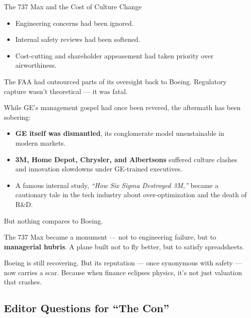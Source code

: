 \begin{HistoricalSidebar}{The 737 Max and the Cost of Culture Change}
  \medskip

  \begin{itemize}
    \item Engineering concerns had been ignored.
    \item Internal safety reviews had been softened.
    \item Cost-cutting and shareholder appeasement had taken priority over airworthiness.
  \end{itemize}

  \medskip
  
  The FAA had outsourced parts of its oversight back to Boeing.  
  Regulatory capture wasn’t theoretical — it was fatal.
  
  \medskip
  
  While GE’s management gospel had once been revered, the aftermath has been sobering:
  
  \medskip

  \begin{itemize}
    \item \textbf{GE itself was dismantled}, its conglomerate model unsustainable in modern markets.
    \item \textbf{3M, Home Depot, Chrysler, and Albertsons} suffered culture clashes and innovation slowdowns under 
    GE-trained executives.
    \item A famous internal study, \textit{“How Six Sigma Destroyed 3M,”} became a cautionary tale in the tech 
    industry about over-optimization and the death of R\&D.
  \end{itemize}

  \medskip
  
  But nothing compares to Boeing.
  
  \medskip
  
  The 737 Max became a monument — not to engineering failure, but to \textbf{managerial hubris}.  
  A plane built not to fly better, but to satisfy spreadsheets.
  
  \medskip
  
  Boeing is still recovering. But its reputation — once synonymous with safety — now carries a scar.  
  Because when finance eclipses physics, it’s not just valuation that crashes.
  
\end{HistoricalSidebar}



\subsection{Editor Questions for ``The Con''}

